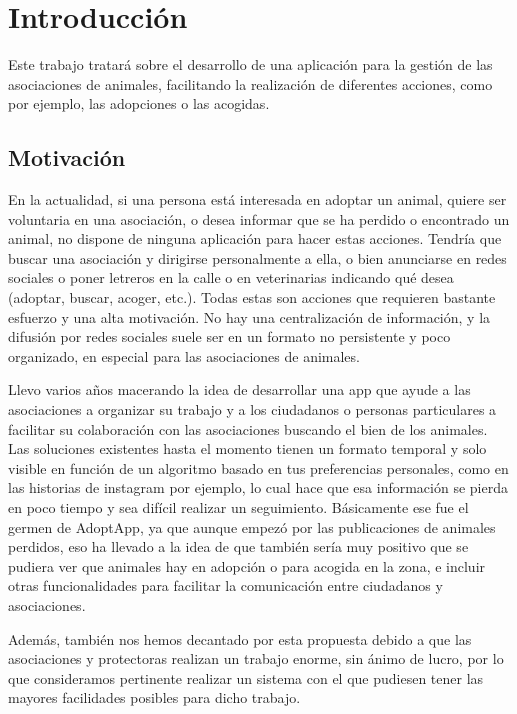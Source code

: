 
\chapter{Introducción}

Este trabajo tratará sobre el desarrollo de una aplicación para la gestión de las asociaciones de animales, facilitando la realización de diferentes acciones, como por ejemplo, las adopciones o las acogidas.

\section{Motivación}

En la actualidad, si una persona está interesada en adoptar un animal, quiere ser voluntaria en una asociación, o desea informar que se ha perdido o encontrado un animal, no dispone de ninguna aplicación para hacer estas acciones. Tendría que buscar una asociación y dirigirse personalmente a ella, o bien anunciarse en redes sociales o poner letreros en la calle o en veterinarias indicando qué desea (adoptar, buscar, acoger, etc.). Todas estas son acciones que requieren bastante esfuerzo y una alta motivación. No hay una centralización de información, y la difusión por redes sociales suele ser en un formato no persistente y poco organizado, en especial para las asociaciones de animales.

Llevo varios años macerando la idea de desarrollar una app que ayude a las asociaciones a organizar su trabajo y a los ciudadanos o personas particulares a facilitar su colaboración con las asociaciones buscando el bien de los animales. Las soluciones existentes hasta el momento tienen un formato temporal y solo visible en función de un algoritmo basado en tus preferencias personales, como en las historias de instagram por ejemplo, lo cual hace que esa información se pierda en poco tiempo y sea difícil realizar un seguimiento. Básicamente ese fue el germen de AdoptApp, ya que aunque empezó por las publicaciones de animales perdidos, eso ha llevado a la idea de que también sería muy positivo que se pudiera ver que animales hay en adopción o para acogida en la zona, e incluir otras funcionalidades para facilitar la comunicación entre ciudadanos y asociaciones.

Además, también nos hemos decantado por esta propuesta debido a que las asociaciones y protectoras realizan un trabajo enorme, sin ánimo de lucro, por lo que consideramos pertinente realizar un sistema con el que pudiesen tener las mayores facilidades posibles para dicho trabajo.

